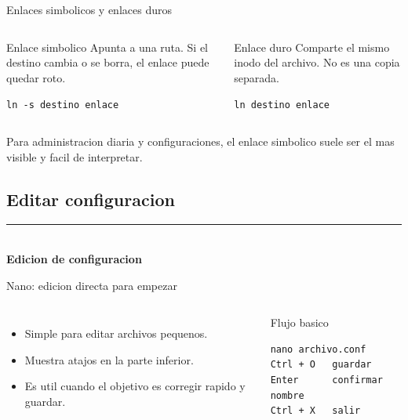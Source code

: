 \documentclass[aspectratio=169]{beamer}
\newcommand{\MainHeaderSlide}[2]{%
  \begin{frame}[plain]
    \hypertarget{#2}{}
    \vspace*{0.25\textheight}
    {\color{black}\rule{0.28\textwidth}{1.2pt}}\\[0.5em]
    {\usebeamerfont{title}\fontsize{34}{40}\selectfont\bfseries #1}
  \end{frame}
}
\begin{document}
\begin{frame}{Enlaces simbolicos y enlaces duros}
  \small
  \begin{columns}[t]
    \begin{block}{Enlace simbolico}
      Apunta a una ruta. Si el destino cambia o se borra, el enlace puede quedar roto.
      \vspace{0.15cm}

      \texttt{ln -s destino enlace}
    \end{block}
    \begin{exampleblock}{Enlace duro}
      Comparte el mismo inodo del archivo. No es una copia separada.
      \vspace{0.15cm}

      \texttt{ln destino enlace}
    \end{exampleblock}
  \end{columns}
  \vfill
  \small Para administracion diaria y configuraciones, el enlace simbolico suele ser el mas visible y facil de interpretar.
\end{frame}

\subsection{Editar configuracion}
\MainHeaderSlide{Edicion de configuracion}{idx-editores-config}

\begin{frame}[fragile]{Nano: edicion directa para empezar}
  \begin{columns}[t]
    \begin{itemize}
      \item Simple para editar archivos pequenos.
      \item Muestra atajos en la parte inferior.
      \item Es util cuando el objetivo es corregir rapido y guardar.
    \end{itemize}
    \begin{exampleblock}{Flujo basico}
\begin{verbatim}
nano archivo.conf
Ctrl + O   guardar
Enter      confirmar nombre
Ctrl + X   salir
\end{verbatim}
    \end{exampleblock}
  \end{columns}
\end{frame}
\end{document}
